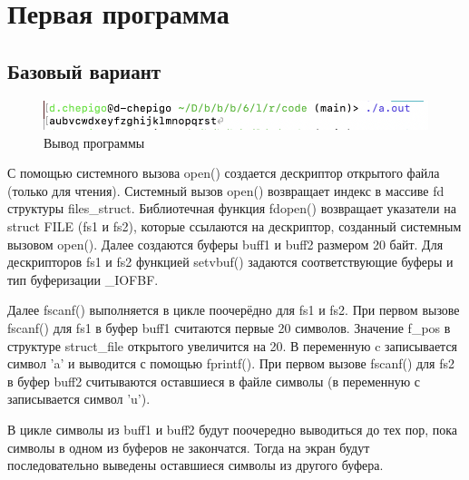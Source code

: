 \section{Первая программа}
\subsection{Базовый вариант}

\begin{figure}[!hbpt]
	\centering
	\includegraphics[width=\textwidth]{image/1-1}
	\caption{Вывод программы}
\end{figure}
\newpage
С помощью системного вызова open() создается дескриптор открытого файла (только для чтения). Системный вызов open() возвращает индекс в массиве fd структуры files\_struct.  Библиотечная функция fdopen() возвращает указатели на struct FILE (fs1 и fs2), которые ссылаются на дескриптор, созданный системным вызовом open(). Далее создаются буферы buff1 и buff2 размером 20 байт. Для дескрипторов fs1 и fs2 функцией setvbuf() задаются соответствующие буферы и тип буферизации \_IOFBF.

Далее fscanf() выполняется в цикле поочерёдно для fs1 и fs2. 
При первом вызове fscanf() для fs1 в буфер buff1 считаются первые 20 символов. Значение f\_pos в структуре struct\_file открытого увеличится на 20. В переменную c записывается символ ’a’ и выводится с помощью fprintf(). При первом вызове fscanf() для fs2 в буфер buff2 считываются оставшиеся в файле символы (в переменную с записывается символ ’u’).

В цикле символы из buff1 и buff2 будут поочередно выводиться до тех пор, пока символы в одном из буферов не закончатся. Тогда на экран будут последовательно выведены оставшиеся символы из другого буфера. 

\newpage
